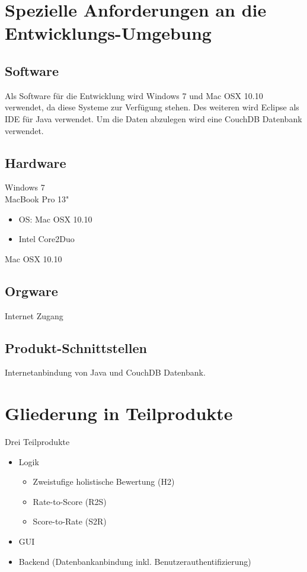 \documentclass[a4paper,listof=leveldown,listof=numbered]{scrreprt}
\begin{document}
\chapter{Spezielle Anforderungen an die Entwicklungs-Umgebung}
	
	\section{Software}
	Als Software für die Entwicklung wird Windows 7 und Mac OSX 10.10 verwendet, da diese Systeme zur Verfügung stehen. Des weiteren wird Eclipse als IDE für Java verwendet. Um die Daten abzulegen wird eine CouchDB Datenbank verwendet.
	\section{Hardware}
	Windows 7\\
	
	MacBook Pro 13"
	\begin{itemize}
		\item OS: Mac OSX 10.10
		\item Intel Core2Duo
	\end{itemize}
	Mac OSX 10.10
	
	\section{Orgware}
	Internet Zugang
	
	\section{Produkt-Schnittstellen}
	Internetanbindung von Java und CouchDB Datenbank.

	
\chapter{Gliederung in Teilprodukte}
	Drei Teilprodukte
	\begin{itemize}
		\item Logik 
			\begin{itemize}
				\item Zweistufige holistische Bewertung (H2)
				\item Rate-to-Score (R2S)
				\item Score-to-Rate (S2R)
			\end{itemize}
		\item GUI
		\item Backend (Datenbankanbindung inkl. Benutzerauthentifizierung)
	\end{itemize}
\end{document}
